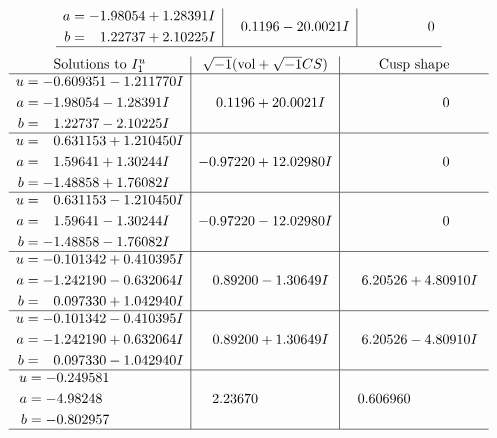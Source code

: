 \documentclass[1p]{elsarticle_modified}
\theoremstyle{definition}
\newcommand{\I}{\sqrt{-1}}
\begin{document}
$$\begin{array}{c|c|c}
\begin{aligned}
a &= -1.98054 + 1.28391 I \\
b &= \phantom{-}1.22737 + 2.10225 I\end{aligned}
 & \phantom{-}0.1196 - 20.0021 I & \phantom{-0.000000 } 0\\
 \hline 
 \end{array}$$\newpage$$\begin{array}{c|c|c}  
\text{Solutions to }I^u_{1}& \I (\text{vol} + \sqrt{-1}CS) & \text{Cusp shape}\\
 \hline 
\begin{aligned}
u &= -0.609351 - 1.211770 I \\
a &= -1.98054 - 1.28391 I \\
b &= \phantom{-}1.22737 - 2.10225 I\end{aligned}
 & \phantom{-}0.1196 + 20.0021 I & \phantom{-0.000000 } 0 \\ \hline\begin{aligned}
u &= \phantom{-}0.631153 + 1.210450 I \\
a &= \phantom{-}1.59641 + 1.30244 I \\
b &= -1.48858 + 1.76082 I\end{aligned}
 & -0.97220 + 12.02980 I & \phantom{-0.000000 } 0 \\ \hline\begin{aligned}
u &= \phantom{-}0.631153 - 1.210450 I \\
a &= \phantom{-}1.59641 - 1.30244 I \\
b &= -1.48858 - 1.76082 I\end{aligned}
 & -0.97220 - 12.02980 I & \phantom{-0.000000 } 0 \\ \hline\begin{aligned}
u &= -0.101342 + 0.410395 I \\
a &= -1.242190 - 0.632064 I \\
b &= \phantom{-}0.097330 + 1.042940 I\end{aligned}
 & \phantom{-}0.89200 - 1.30649 I & \phantom{-}6.20526 + 4.80910 I \\ \hline\begin{aligned}
u &= -0.101342 - 0.410395 I \\
a &= -1.242190 + 0.632064 I \\
b &= \phantom{-}0.097330 - 1.042940 I\end{aligned}
 & \phantom{-}0.89200 + 1.30649 I & \phantom{-}6.20526 - 4.80910 I \\ \hline\begin{aligned}
u &= -0.249581\phantom{ +0.000000I} \\
a &= -4.98248\phantom{ +0.000000I} \\
b &= -0.802957\phantom{ +0.000000I}\end{aligned}
 & \phantom{-}2.23670\phantom{ +0.000000I} & \phantom{-}0.606960\phantom{ +0.000000I}\\
 \hline 
 \end{array}$$\newpage\newpage\renewcommand{\arraystretch}{1}
\end{document}

